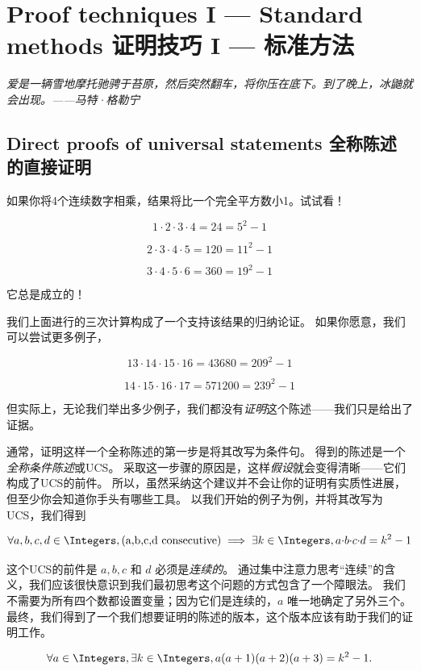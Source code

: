 

\chapter{Proof techniques I --- Standard methods 证明技巧 I --- 标准方法}
\label{ch:proof1}

{\em 爱是一辆雪地摩托驰骋于苔原，然后突然翻车，将你压在底下。到了晚上，冰鼬就会出现。——马特·格勒宁}

\section{Direct proofs of universal statements 全称陈述的直接证明}
\label{sec:direct}

如果你将4个连续数字相乘，结果将比一个完全平方数小1。试试看！

\[ 1 \cdot 2 \cdot 3 \cdot 4 = 24 = 5^2 - 1 \]

\[ 2 \cdot 3 \cdot 4 \cdot 5 = 120 = 11^2 - 1 \]

\[ 3 \cdot 4 \cdot 5 \cdot 6 = 360 = 19^2 - 1 \]

它总是成立的！

我们上面进行的三次计算构成了一个支持该结果的归纳论证。
如果你愿意，我们可以尝试更多例子，

\[ 13 \cdot 14 \cdot 15 \cdot 16 = 43680 = 209^2 - 1 \]

\[ 14 \cdot 15 \cdot 16 \cdot 17 = 571200 = 239^2 - 1 \]

\noindent 但实际上，无论我们举出多少例子，我们都没有{\em 证明}这个陈述——我们只是给出了证据。

通常，证明这样一个全称陈述的第一步是将其改写为条件句。
得到的陈述是一个\emph{全称条件陈述}或UCS。
采取这一步骤的原因是，这样\emph{假设}就会变得清晰——它们构成了UCS的前件。
所以，虽然采纳这个建议并不会让你的证明有实质性进展，但至少你会知道你手头有哪些工具。
以我们开始的例子为例，并将其改写为UCS，我们得到

\[ \forall a,b,c,d \in \Integers, (\mbox{a,b,c,d  consecutive})
      \implies \exists k \in \Integers, a{\cdot}b{\cdot}c{\cdot}d = k^2 -1
\]

这个UCS的前件是 $a,b,c$ 和 $d$ 必须是{\em 连续的}。
通过集中注意力思考“连续”的含义，我们应该很快意识到我们最初思考这个问题的方式包含了一个障眼法。
我们不需要为所有四个数都设置变量；因为它们是连续的，$a$ 唯一地确定了另外三个。
最终，我们得到了一个我们想要证明的陈述的版本，这个版本应该有助于我们的证明工作。

\begin{thm}
      \[ \forall a \in \Integers, \exists k \in \Integers,
            a(a+1)(a+2)(a+3) = k^2 - 1. \]
\end{thm}


